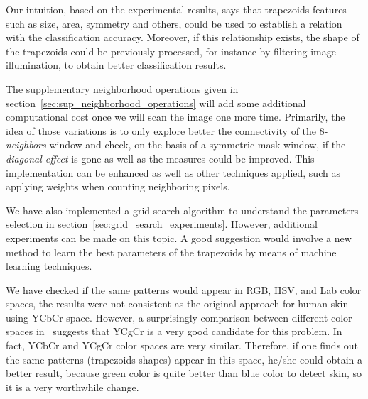 Our intuition, based on the experimental results, says that trapezoids features such as size, area, symmetry and others, could be used to establish a relation with the classification accuracy. Moreover, if  this relationship exists, the shape of the trapezoids could be previously processed, for instance by filtering image illumination, to obtain better classification results.

The supplementary neighborhood operations given in section~\ref{sec:sup_neighborhood_operations} will add some additional computational cost once we will scan the image one more time. Primarily, the idea of those variations is to only explore better the connectivity of the 8-\textit{neighbors} window and check, on the basis of a symmetric mask window, if the \textit{diagonal effect} is gone as well as the measures could be improved. This implementation can be enhanced as well as other techniques applied, such as applying weights when counting neighboring pixels.

We have also implemented a grid search algorithm to understand the parameters selection in section~\ref{sec:grid_search_experiments}. However, additional experiments can be made on this topic. A good suggestion would involve a new method to learn the best parameters of the trapezoids by means of machine learning techniques.

We have checked if the same patterns would appear in RGB, HSV, and Lab color spaces, the results were not consistent as the original approach for human skin using YCbCr space. However, a surprisingly comparison between different color spaces in~\citet{chaves:10} suggests that YCgCr is a very good candidate for this problem. In fact, YCbCr and YCgCr color spaces are very similar. Therefore, if one finds out the same patterns (trapezoids shapes) appear in this space, he/she could obtain a better result, because green color is quite better than blue color to detect skin, so it is a very worthwhile change.